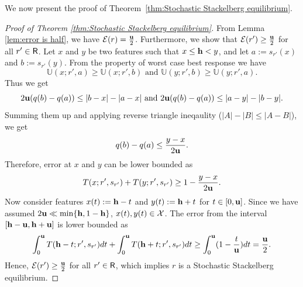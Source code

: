 We now present the proof of Theorem~\ref{thm:Stochastic Stackelberg equilibrium}.

\begin{proof}[Proof of Theorem \ref{thm:Stochastic Stackelberg equilibrium}]\label{proof:stochastic_stackelberg_eq}
    From Lemma \ref{lem:error is half}, we have $\mathcal{E}(r) = \frac{\mathbf{u}}{2}$.
    Furthermore, we show that $\mathcal{E}(r') \geq \frac{\mathbf{u}}{2}$ for all $r' \in \mathsf{R}$.
    Let $x$ and $y$ be two features such that $x \le \mathbf{h} < y$, and let $a := s_{r'}(x)$ and $b := s_{r'}(y)$. From the property of worst case best response we have
\begin{equation*}
    \mathbb{U}(x;r',a) \ge \mathbb{U}(x;r',b) \text{ and } 
    \mathbb{U}(y;r',b) \ge \mathbb{U}(y;r',a).
\end{equation*}
Thus we get 
\begin{equation*}
    2\mathbf{u} (q(b)-q(a)) \leq |b-x| - |a-x| \text{ and } 2\mathbf{u} (q(b)-q(a)) \leq |a-y| - |b-y|.
\end{equation*}
Summing them up and applying reverse triangle ineqaulity ($|A|-|B| \le |A-B|$), we get
$$q(b) - q(a) \le \frac{y-x}{2\mathbf{u}}.$$
Therefore, error at $x$ and $y$ can be lower bounded as
$$T(x;r',s_{r'}) + T(y;r',s_{r'}) \ge 1 - \frac{y-x}{2\mathbf{u}}.$$
Now consider features $x(t)  := \mathbf{h} - t$ and $y(t) := \mathbf{h} + t$ for $t \in [0,\mathbf{u}]$. Since we have assumed $2\mathbf{u} \ll \min\{\mathbf{h}, 1-\mathbf{h}\}$, $x(t), y(t) \in \mathcal{X}$.
The error from the interval $[\mathbf{h} - \mathbf{u}, \mathbf{h} + \mathbf{u}]$ is lower bounded as
$$\int_0^{\mathbf{u}} T(\mathbf{h} - t;r',s_{r'}) dt + \int_0^{\mathbf{u}} T(\mathbf{h} + t;r',s_{r'})dt \ge \int_0^{\mathbf{u}} (1-\frac{t}{\mathbf{u}})dt = \frac{\mathbf{u}}{2}.$$
Hence, $\mathcal{E}(r') \geq \frac{\mathbf{u}}{2}$ for all $r' \in \mathsf{R}$, which implies $r$ is a Stochastic Stackelberg equilibrium.
\end{proof}
